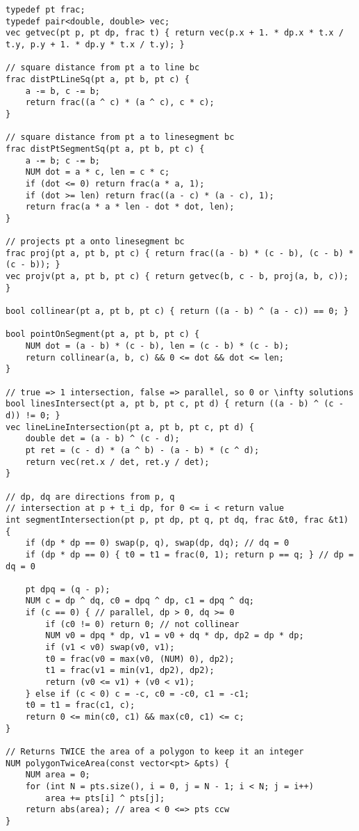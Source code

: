 \documentclass[8pt,a4paper,landscape,oneside]{amsart}
\begin{document}
\begin{multicols*}{3}
\begin{lstlisting}
typedef pt frac;
typedef pair<double, double> vec;
vec getvec(pt p, pt dp, frac t) { return vec(p.x + 1. * dp.x * t.x / t.y, p.y + 1. * dp.y * t.x / t.y); }

// square distance from pt a to line bc
frac distPtLineSq(pt a, pt b, pt c) {
	a -= b, c -= b;
	return frac((a ^ c) * (a ^ c), c * c);
}

// square distance from pt a to linesegment bc
frac distPtSegmentSq(pt a, pt b, pt c) {
	a -= b; c -= b;
	NUM dot = a * c, len = c * c;
	if (dot <= 0) return frac(a * a, 1);
	if (dot >= len) return frac((a - c) * (a - c), 1);
	return frac(a * a * len - dot * dot, len);
}

// projects pt a onto linesegment bc
frac proj(pt a, pt b, pt c) { return frac((a - b) * (c - b), (c - b) * (c - b)); }
vec projv(pt a, pt b, pt c) { return getvec(b, c - b, proj(a, b, c)); }

bool collinear(pt a, pt b, pt c) { return ((a - b) ^ (a - c)) == 0; }

bool pointOnSegment(pt a, pt b, pt c) {
	NUM dot = (a - b) * (c - b), len = (c - b) * (c - b);
	return collinear(a, b, c) && 0 <= dot && dot <= len;
}

// true => 1 intersection, false => parallel, so 0 or \infty solutions
bool linesIntersect(pt a, pt b, pt c, pt d) { return ((a - b) ^ (c - d)) != 0; }
vec lineLineIntersection(pt a, pt b, pt c, pt d) {
	double det = (a - b) ^ (c - d);
	pt ret = (c - d) * (a ^ b) - (a - b) * (c ^ d);
	return vec(ret.x / det, ret.y / det);
}

// dp, dq are directions from p, q
// intersection at p + t_i dp, for 0 <= i < return value
int segmentIntersection(pt p, pt dp, pt q, pt dq, frac &t0, frac &t1)
{
	if (dp * dp == 0) swap(p, q), swap(dp, dq); // dq = 0
	if (dp * dp == 0) { t0 = t1 = frac(0, 1); return p == q; } // dp = dq = 0

	pt dpq = (q - p);
	NUM c = dp ^ dq, c0 = dpq ^ dp, c1 = dpq ^ dq;
	if (c == 0) { // parallel, dp > 0, dq >= 0
		if (c0 != 0) return 0; // not collinear
		NUM v0 = dpq * dp, v1 = v0 + dq * dp, dp2 = dp * dp;
		if (v1 < v0) swap(v0, v1);
		t0 = frac(v0 = max(v0, (NUM) 0), dp2);
		t1 = frac(v1 = min(v1, dp2), dp2);
		return (v0 <= v1) + (v0 < v1);
	} else if (c < 0) c = -c, c0 = -c0, c1 = -c1;
	t0 = t1 = frac(c1, c);
	return 0 <= min(c0, c1) && max(c0, c1) <= c;
}

// Returns TWICE the area of a polygon to keep it an integer
NUM polygonTwiceArea(const vector<pt> &pts) {
	NUM area = 0;
	for (int N = pts.size(), i = 0, j = N - 1; i < N; j = i++)
		area += pts[i] ^ pts[j];
	return abs(area); // area < 0 <=> pts ccw
}


\end{lstlisting}
\end{multicols*}
\end{document}
